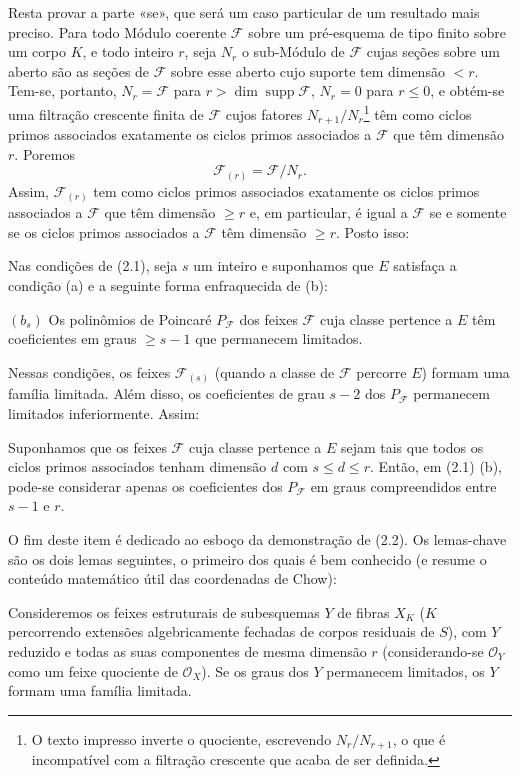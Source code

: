 Resta provar a parte «se», que será um caso particular de um resultado mais
preciso. Para todo Módulo coerente $\mathcal F$ sobre um pré-esquema de tipo
finito sobre um corpo $K$, e todo inteiro $r$, seja $N_r$ o sub-Módulo de
$\mathcal F$ cujas seções sobre um aberto são as seções de $\mathcal F$ sobre
esse aberto cujo suporte tem dimensão $<r$. Tem-se, portanto,
$N_r=\mathcal F$ para $r>\dim\operatorname{supp}\mathcal F$, $N_r=0$ para
$r\leq0$, e obtém-se uma filtração crescente finita de $\mathcal F$ cujos
fatores $N_{r+1}/N_r$\footnote{O texto impresso inverte o quociente, escrevendo
$N_r/N_{r+1}$, o que é incompatível com a filtração crescente que acaba de ser
definida.} têm como ciclos primos associados exatamente os ciclos primos
associados a $\mathcal F$ que têm dimensão $r$. Poremos
\[
\mathcal F_{(r)}=\mathcal F/N_r.
\]
Assim, $\mathcal F_{(r)}$ tem como ciclos primos associados exatamente os
ciclos primos associados a $\mathcal F$ que têm dimensão $\geq r$ e, em
particular, é igual a $\mathcal F$ se e somente se os ciclos primos associados
a $\mathcal F$ têm dimensão $\geq r$. Posto isso:

 Nas condições de (2.1), seja $s$ um inteiro e suponhamos
que $E$ satisfaça a condição (a) e a seguinte forma enfraquecida de (b):

\medskip
\noindent $(b_s)$ Os polinômios de Poincaré $P_{\mathcal F}$ dos feixes
$\mathcal F$ cuja classe pertence a $E$ têm coeficientes em graus
$\geq s-1$ que permanecem limitados.

Nessas condições, os feixes $\mathcal F_{(s)}$ (quando a classe de
$\mathcal F$ percorre $E$) formam uma família limitada. Além disso, os
coeficientes de grau $s-2$ dos $P_{\mathcal F}$ permanecem limitados
inferiormente.
Assim:

 Suponhamos que os feixes $\mathcal F$ cuja classe
pertence a $E$ sejam tais que todos os ciclos primos associados tenham dimensão
$d$ com $s\leq d\leq r$. Então, em (2.1) (b), pode-se considerar apenas os
coeficientes dos $P_{\mathcal F}$ em graus compreendidos entre $s-1$ e $r$.

O fim deste item é dedicado ao esboço da demonstração de (2.2). Os lemas-chave
são os dois lemas seguintes, o primeiro dos quais é bem conhecido (e resume o
conteúdo matemático útil das coordenadas de Chow):

 Consideremos os feixes estruturais de subesquemas
$Y$ de fibras $X_K$ ($K$ percorrendo extensões algebricamente fechadas de
corpos residuais de $S$), com $Y$ reduzido e todas as suas componentes de mesma
dimensão $r$ (considerando-se $\mathcal O_Y$ como um feixe quociente de
$\mathcal O_X$). Se os graus dos $Y$ permanecem limitados, os $Y$ formam uma
família limitada.

